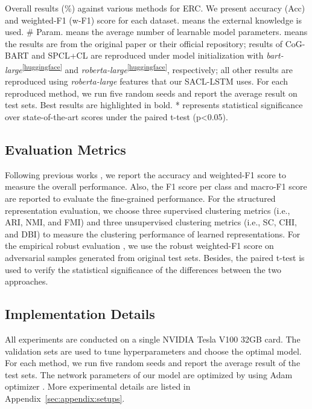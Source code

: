 \documentclass[11pt]{article}
\begin{document}
\begin{table*}[t]
    \centering
    \resizebox{0.96\linewidth}{!}{^\dag^\ddag^\ddag^\dag^\dag^*^*^*^*^*^*^*}
    \caption{Overall results
    (\%) against various methods for ERC. 
    We present accuracy (Acc) and weighted-F1 (w-F1) score for each dataset.
     means the external knowledge is used.
    \# Param. means the average number of learnable model parameters.
     means the results are from the original paper or their official repository; results of CoG-BART and SPCL+CL are reproduced under model initialization with 
    \textit{bart-large}\textsuperscript{\ref{huggingface}}
    and  \textit{roberta-large}\textsuperscript{\ref{huggingface}},
    respectively; all other results are reproduced using \textit{roberta-large} features that our SACL-LSTM uses. 
    For each reproduced method, we run five random seeds and report the average result on test sets. Best results are highlighted in bold. {*} represents statistical significance over state-of-the-art scores under the paired t-test (p<0.05).
    }
    \label{tab:result}
\end{table*}


\subsection{Evaluation Metrics}
Following previous works \cite{DBLP:conf/acl/HuWH20,DBLP:conf/aaai/LiYQ22}, we report the accuracy and weighted-F1 score to measure the overall performance. 
Also, the F1 score per class and macro-F1 score are reported to evaluate the fine-grained performance.
For the structured representation evaluation, we choose three supervised clustering metrics (i.e., ARI, NMI, and FMI) and three unsupervised clustering metrics (i.e., SC, CHI, and DBI) to measure the clustering performance of learned representations.
For the empirical robust evaluation \cite{DBLP:conf/sp/Carlini017}, we use the robust weighted-F1 score on adversarial samples generated from original test sets.
Besides, the paired t-test \cite{kim2015t} is used to verify the statistical significance of the differences between the two approaches.

\subsection{Implementation Details}
All experiments are conducted on a single NVIDIA Tesla V100 32GB card. 
The validation sets are used to tune hyperparameters and choose the optimal model.
For each method, we run five random seeds and report the average result of the test sets.
The network parameters of our model are optimized by using Adam optimizer \citep{DBLP:journals/corr/KingmaB14}.
More experimental details are listed in Appendix~\ref{sec:appendix:setups}.
\end{document}

